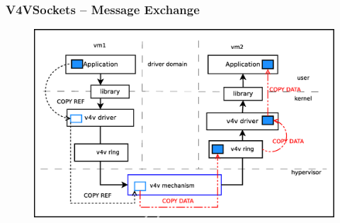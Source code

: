 \documentclass[red,slidestop,notes,compress,mathserif]{beamer}
\begin{document}
\begin{frame}
\frametitle{V4VSockets -- Message Exchange}
\begin{figure}
\includegraphics[scale=0.30]{figures/v4vsockets.eps}
\end{figure}
\end{frame}
\end{document}
